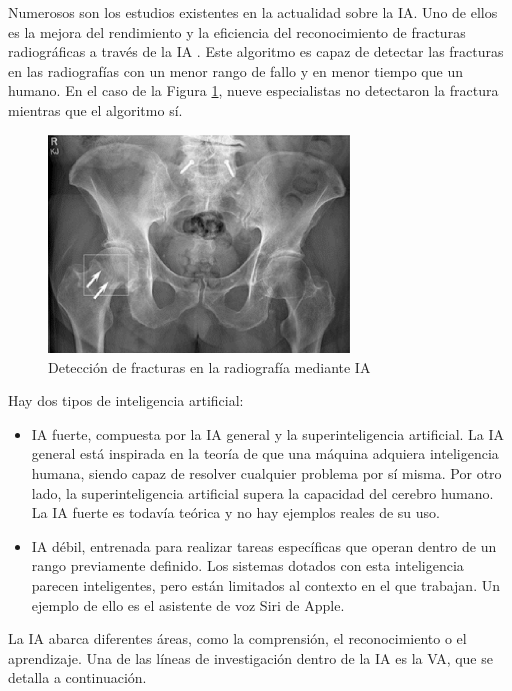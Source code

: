 Numerosos son los estudios existentes en la actualidad sobre la IA. Uno de ellos es la mejora del rendimiento y la eficiencia  del reconocimiento de fracturas radiográficas a través de la IA \cite{guermazi21}. Este algoritmo es capaz de detectar las fracturas en las radiografías con un menor rango de fallo y en menor tiempo que un humano. En el caso de la Figura \ref{fig:rad1}, nueve especialistas no detectaron la fractura mientras que el algoritmo sí.\\
\begin{figure} [h!]
  \begin{center}
    \includegraphics[width=8cm]{figs/rad1}
  \end{center}
  \caption{Detección de fracturas en la radiografía mediante IA}
  \label{fig:rad1}
\end{figure}

Hay dos tipos de inteligencia artificial:
\begin{itemize}
 \item{IA fuerte,} compuesta por la IA general y la superinteligencia artificial. La IA general está inspirada en la teoría de que una máquina adquiera inteligencia humana, siendo capaz de resolver cualquier problema por sí misma. Por otro lado, la superinteligencia artificial supera la capacidad del cerebro humano. La IA fuerte es todavía teórica y no hay ejemplos reales de su uso.
  \item{IA débil,} entrenada para realizar tareas específicas que operan dentro de un rango previamente definido. Los sistemas dotados con esta inteligencia parecen inteligentes, pero están limitados al contexto en el que trabajan. Un ejemplo de ello es el asistente de voz Siri de Apple.
\end{itemize}

La IA abarca diferentes áreas, como la comprensión, el reconocimiento o el aprendizaje. Una de las líneas de investigación dentro de la IA es la VA, que se detalla a continuación.\\


